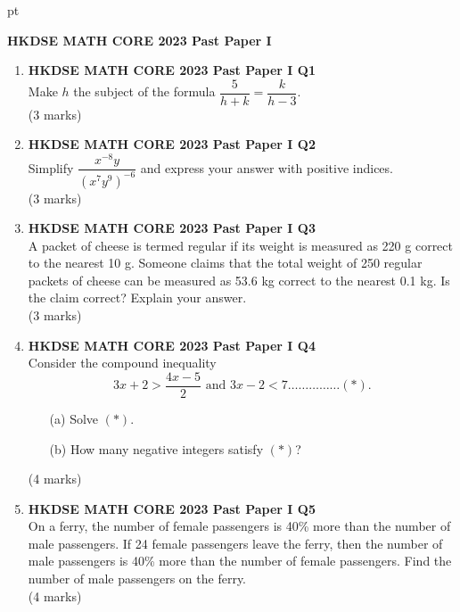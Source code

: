 \documentclass[12pt]{article}
\begin{document}
 pt
\begin{center}
	{\large \bf HKDSE MATH CORE 2023 Past Paper I}\\
	\vspace{2 mm}

\end{center}
\vspace{0.05cm}

\begin{enumerate}
	\item \textbf{HKDSE MATH CORE 2023 Past Paper I Q1}\\
	Make $h$ the subject of the formula $\dfrac{5}{h + k} = \dfrac{k}{h - 3}$. \\(3 marks)

	\item \textbf{HKDSE MATH CORE 2023 Past Paper I Q2}\\
	Simplify $\dfrac{x^{-8}y}{(x^7y^9)^{-6}}$ and express your answer with positive indices. \\(3 marks)	

	\item \textbf{HKDSE MATH CORE 2023 Past Paper I Q3}\\
	A packet of cheese is termed regular if its weight is measured as 220 g correct to the nearest 10 g. Someone claims that the total weight of 250 regular packets of cheese can be measured as 53.6 kg
	correct to the nearest 0.1 kg. Is the claim correct? Explain your answer. \\(3 marks)

	\item \textbf{HKDSE MATH CORE 2023 Past Paper I Q4}\\
	Consider the compound inequality $$3x + 2 > \dfrac{4x - 5}{2} \text{ and } 3x - 2 < 7 \dots\dots\dots\dots\dots (*) .$$
	\begin{enumerate}
		\item[(a)] Solve $(*)$.
		\item[(b)] How many negative integers satisfy $(*)$?
	\end{enumerate}
	(4 marks)

	\item \textbf{HKDSE MATH CORE 2023 Past Paper I Q5}\\
	On a ferry, the number of female passengers is 40\% more than the number of male passengers. If 24 female passengers leave the ferry, then the number of male passengers is 40\% more than the number of female passengers. Find the number of male passengers on the ferry.  \\(4 marks)



\end{enumerate}
\end{document}

